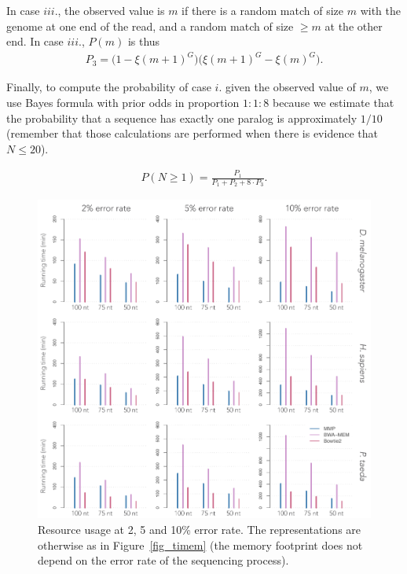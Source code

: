 \documentclass[a4,center,fleqn]{NAR}
\begin{document}
In case $iii.$, the observed value is $m$ if there is a random match of
size $m$ with the genome at one end of the read, and a random match of
size $\geq m$ at the other end. In case $iii.$, $P(m)$ is thus
\begin{align*}
P_3 = \big(1-\xi(m+1)^G\big) \big(\xi(m+1)^G - \xi(m)^G\big).
\end{align*}

Finally, to compute the probability of case $i.$ given the observed value
of $m$, we use Bayes formula with prior odds in proportion $1:1:8$ because
we estimate that the probability that a sequence has exactly one paralog
is approximately $1/10$ (remember that those calculations are performed
when there is evidence that $N \leq 20$).

\begin{align*}
P(N \geq 1) = \frac{P_1}{P_1 + P_2 + 8\cdot P_3}.
\end{align*}

\clearpage

\begin{figure}
\begin{center}
\includegraphics[scale=.53]{timem_supp.pdf}
\end{center}
\caption{Resource usage at 2, 5 and 10\% error rate. The representations
are otherwise as in Figure~\ref{fig_timem} (the memory footprint does not
depend on the error rate of the sequencing process).}
\end{figure}
\end{document}
